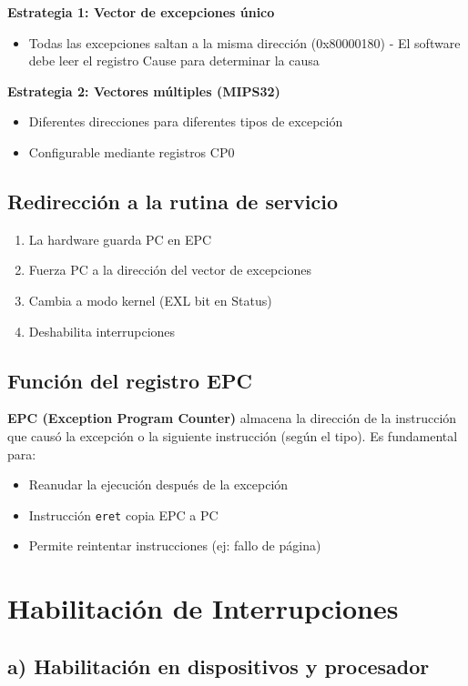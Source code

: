 \documentclass[12pt,a4paper]{article}
\begin{document}
\textbf{Estrategia 1: Vector de excepciones único}
\begin{itemize}
    \item Todas las excepciones saltan a la misma dirección (0x80000180)
    - El software debe leer el registro Cause para determinar la causa
\end{itemize}

\textbf{Estrategia 2: Vectores múltiples (MIPS32)}
\begin{itemize}
    \item Diferentes direcciones para diferentes tipos de excepción
    \item Configurable mediante registros CP0
\end{itemize}

\subsection{Redirección a la rutina de servicio}
\begin{enumerate}
    \item La hardware guarda PC en EPC
    \item Fuerza PC a la dirección del vector de excepciones
    \item Cambia a modo kernel (EXL bit en Status)
    \item Deshabilita interrupciones
\end{enumerate}

\subsection{Función del registro EPC}
\textbf{EPC (Exception Program Counter)} almacena la dirección de la instrucción que causó la excepción o la siguiente instrucción (según el tipo). Es fundamental para:
\begin{itemize}
    \item Reanudar la ejecución después de la excepción
    \item Instrucción \texttt{eret} copia EPC a PC
    \item Permite reintentar instrucciones (ej: fallo de página)
\end{itemize}

\section{Habilitación de Interrupciones}

\subsection{a) Habilitación en dispositivos y procesador}
\end{document}
